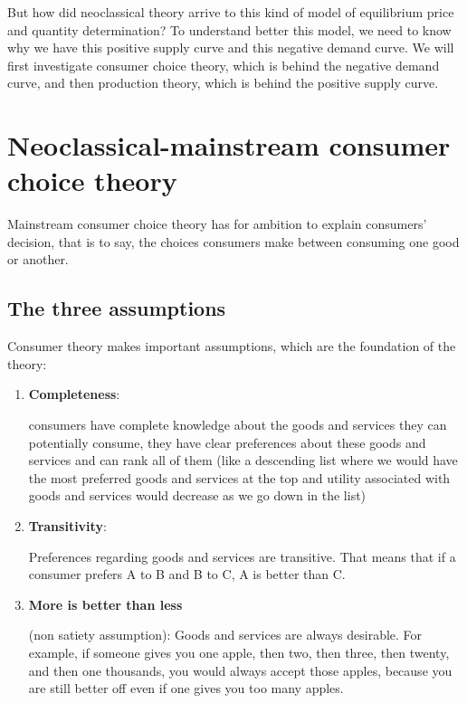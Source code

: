 \documentclass[
  letterpaper,
  DIV=11,
  numbers=noendperiod]{scrreprt}
\begin{document}
But how did neoclassical theory arrive to this kind of model of
equilibrium price and quantity determination? To understand better this
model, we need to know why we have this positive supply curve and this
negative demand curve. We will first investigate consumer choice theory,
which is behind the negative demand curve, and then production theory,
which is behind the positive supply curve.

\hypertarget{neoclassical-mainstream-consumer-choice-theory}{%
\chapter{Neoclassical-mainstream consumer choice
theory}\label{neoclassical-mainstream-consumer-choice-theory}}

Mainstream consumer choice theory has for ambition to explain consumers'
decision, that is to say, the choices consumers make between consuming
one good or another.

\hypertarget{the-three-assumptions}{%
\section{The three assumptions}\label{the-three-assumptions}}

Consumer theory makes important assumptions, which are the foundation of
the theory:

\begin{enumerate}
\def\labelenumi{\arabic{enumi}.}
\item
  \textbf{Completeness}:

  consumers have complete knowledge about the goods and services they
  can potentially consume, they have clear preferences about these goods
  and services and can rank all of them (like a descending list where we
  would have the most preferred goods and services at the top and
  utility associated with goods and services would decrease as we go
  down in the list)
\item
  \textbf{Transitivity}:

  Preferences regarding goods and services are transitive. That means
  that if a consumer prefers A to B and B to C, A is better than C.
\item
  \textbf{More is better than less}

  (non satiety assumption): Goods and services are always desirable. For
  example, if someone gives you one apple, then two, then three, then
  twenty, and then one thousands, you would always accept those apples,
  because you are still better off even if one gives you too many
  apples.
\end{enumerate}
\end{document}
